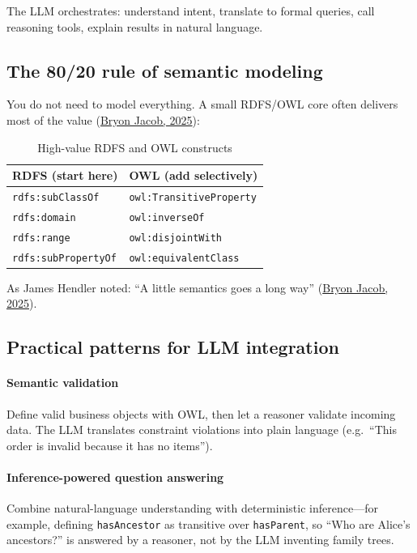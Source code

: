 The LLM orchestrates: understand intent, translate to formal queries, call
reasoning tools, explain results in natural language.

\subsection{The 80/20 rule of semantic modeling}

You do not need to model everything. A small RDFS/OWL core often delivers most of
the value (\href{https://bryon.io/from-facts-to-knowledge-the-layer-cake-of-rdfs-and-owl-e84819d8075d}{Bryon Jacob, 2025}):

\begin{table}[htbp]
  \centering
  \small
  \caption{High-value RDFS and OWL constructs}
  \label{tab:rdfs-owl-constructs}
  \renewcommand{\arraystretch}{1.15}
  \begin{tabularx}{\textwidth}{@{}l X@{}}
    \toprule
    \textbf{RDFS (start here)} & \textbf{OWL (add selectively)} \\
    \midrule
    \texttt{rdfs:subClassOf} & \texttt{owl:TransitiveProperty} \\
    \texttt{rdfs:domain} & \texttt{owl:inverseOf} \\
    \texttt{rdfs:range} & \texttt{owl:disjointWith} \\
    \texttt{rdfs:subPropertyOf} & \texttt{owl:equivalentClass} \\
    \bottomrule
  \end{tabularx}
\end{table}

As James Hendler noted: ``A little semantics goes a long way''
(\href{https://bryon.io/from-facts-to-knowledge-the-layer-cake-of-rdfs-and-owl-e84819d8075d}{Bryon Jacob, 2025}).

\subsection{Practical patterns for LLM integration}

\paragraph{Semantic validation}

Define valid business objects with OWL, then let a reasoner validate incoming
data. The LLM translates constraint violations into plain language (e.g.\ ``This
order is invalid because it has no items'').

\paragraph{Inference-powered question answering}

Combine natural-language understanding with deterministic inference---for
example, defining \texttt{hasAncestor} as transitive over \texttt{hasParent}, so
``Who are Alice's ancestors?'' is answered by a reasoner, not by the LLM inventing
family trees.
